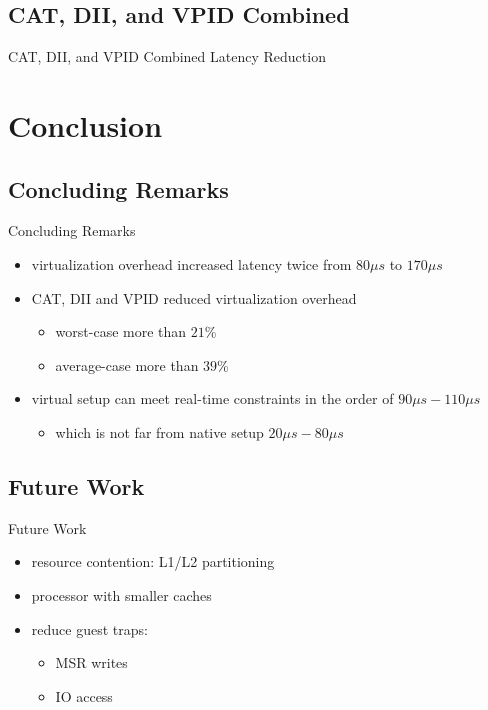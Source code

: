 \documentclass[10pt,hyperref={hyperfootnotes=false}, xcolor={usenames, dvipsnames}]{beamer}
\begin{document}
\subsection{CAT, DII, and VPID Combined}
\begin{frame}[allowframebreaks]{CAT, DII, and VPID Combined} {Latency Reduction}
	
\end{frame}

\section{Conclusion}
\subsection{Concluding Remarks}
\begin{frame}{Concluding Remarks}
  \begin{itemize}
  \item {virtualization overhead increased latency twice {from $80\mu{}s$ to $170\mu{}s$}} \pause{}
  \item {CAT, DII and VPID reduced virtualization overhead}  \pause{}
		\begin{itemize}
			\item{worst-case more than $21$\%}  \pause{}
			\item{average-case more than $39$\%}  \pause{}
		\end{itemize}
  \item {virtual setup can meet real-time constraints in the order of $90\mu{}s-110\mu{}s$} \pause{}
	  	\begin{itemize}
	     	\item {which is not far from native setup  $20\mu{}s-80\mu{}s$}
		\end{itemize}
  \end{itemize}
\end{frame}
\subsection{Future Work}
\begin{frame}{Future Work}
  \begin{itemize}
	\item {resource contention: L1/L2 partitioning} \pause{}
	\item {processor with smaller caches} \pause{}
    \item {reduce guest traps:} 
		  \begin{itemize}
			\item {MSR writes} \pause{}
			\item {IO access}
		  \end{itemize}
  \end{itemize}
\end{frame}
\end{document}
